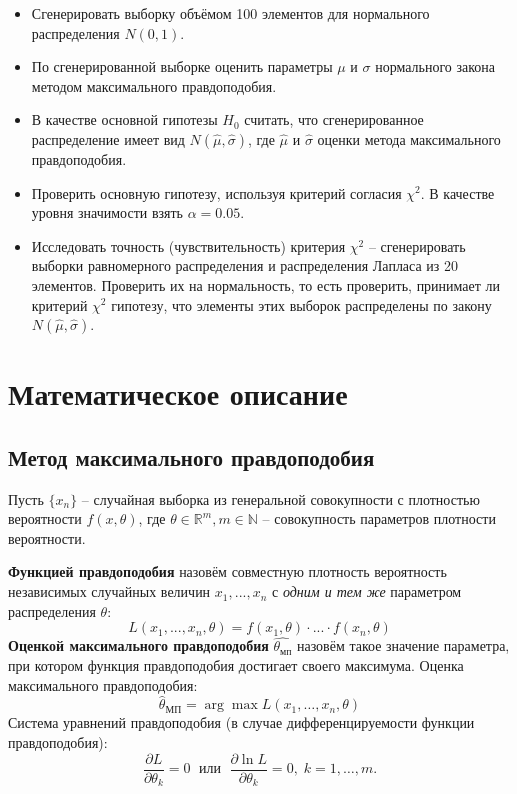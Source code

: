\documentclass[12pt]{article}
\begin{document}
\begin{itemize}
	\item Сгенерировать выборку объёмом 100 элементов для нормального распределения $N(0,1)$.
\item По сгенерированной выборке оценить параметры $\mu$ и $\sigma$ нормального закона методом максимального правдоподобия.
\item В качестве основной гипотезы $H_0$ считать, что сгенерированное распределение имеет вид $N(\hat{\mu}, \hat{\sigma})$, где $\hat{\mu}$ и $\hat{\sigma}$ оценки метода максимального правдоподобия.
\item Проверить основную гипотезу, используя критерий согласия $\chi^2$. В качестве уровня значимости взять $\alpha = 0.05$.
\item Исследовать точность (чувствительность) критерия $\chi^2$ -- сгенерировать выборки равномерного распределения и распределения Лапласа из 20 элементов. Проверить их на нормальность, то есть проверить, принимает ли критерий $\chi^2$ гипотезу, что элементы этих выборок распределены по закону $N(\hat{\mu}, \hat{\sigma})$.
\end{itemize}


\newpage
\section{Математическое описание}
\subsection{Метод максимального правдоподобия}
	\par Пусть $\{x_n\}$ -- случайная выборка из генеральной совокупности с плотностью вероятности $f(x, \theta)$, где $\theta \in \mathbb{R}^m, m \in \mathbb{N}$ -- совокупность параметров плотности вероятности.
\vskip 0.3cm
	\par \textbf{Функцией правдоподобия} назовём совместную плотность вероятность независимых случайных величин $x_1, ..., x_n$ с \textit{одним и тем же} параметром распределения $\theta$:
	\begin{equation}
	L(x_1, ..., x_n, \theta) = f(x_1, \theta) \cdot ... \cdot f(x_n, \theta)
	\end{equation}
\vskip 0.3cm
	\textbf{Оценкой максимального правдоподобия} $\hat{\theta_{мп}}$ назовём такое значение параметра, при котором функция правдоподобия достигает своего максимума.
\vskip 0.3cm
	Оценка максимального правдоподобия:
	\begin{equation}
		\hat{\theta}_{\text{МП}} = \arg\max L(x_1,\dots,x_n,\theta)
	\end{equation}
	Система уравнений правдоподобия (в случае дифференцируемости функции правдоподобия):
	\begin{equation}
		\frac{\partial L}{\partial \theta_k} = 0 \; \text{ или } \; \frac{\partial \ln L}{\partial \theta_k} = 0, \; k = 1,\dots,m.
		\label{difEquation}
	\end{equation}
\end{document}
